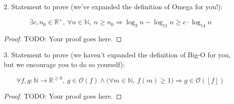 \documentclass[fontsize=11pt]{article}
\newcommand{\N}{\mathbb{N}}
\newcommand{\Z}{\mathbb{Z}}
\newcommand{\R}{\mathbb{R}}
\newcommand{\cO}{\mathcal{O}}
\newcommand{\floor}[1]{\left\lfloor #1 \right\rfloor}
\begin{document}
\begin{enumerate}
\begin{proof}
\begin{enumerate}
    \item[3.] Proving for $\forall e \in \N, e | (a + kn) \land e | n \implies e \le 1$ \\
        Let $e \in \N$ \\
        Suppose $e | (a + kn) \land e | n$ \\
        $a + kn = ex \land n = ey$ for some $x,y \in \Z$ \\
        $a + key = ex$ for some $x,y \in \Z$ \\
        $a = e(ky + x)$ for some $x,y \in \Z$ \\
        Let $c = (ky + x)$ \\
        By substitution, we now have: $a = ec$ \\
        Therefore, $\exists c \in \Z$ s.t. $a = ec$ is true. \\
        Which means $e | a$ is true. \\
        Since we are given $\forall e_2 \in \N, e_2 | a \land e_2 | n \implies e_2 \le 1$ \\
        Take $e_2 = e$, we now have $e | a \land e | n \implies e \le 1$ \\
        And since we now know $e | a$ and $e | n$, we can conclude $e \le 1$. \\
        Which is what we want to show.
\end{enumerate}


\end{proof}

\item[2.] Statement to prove (we've expanded the definition of Omega for you!):

$$\exists c, n_0 \in \R^+,~ \forall n \in \N,~ n \geq n_0 \Rightarrow \log_{3} n - \log_{11} n \geq c \cdot \log_{14} n$$

\begin{proof}
TODO: Your proof goes here.
\end{proof}

\item[3.] Statement to prove (we haven't expanded the definition of Big-O for you, but we encourage you to do so yourself):

$$\forall f, g: \N \to \R^{\geq 0},~ g \in \cO(f) \land \big(\forall m \in \N,~ f(m) \geq 1 \big) \Rightarrow g \in \cO(\floor{f})$$

\begin{proof}
TODO: Your proof goes here.
\end{proof}

\end{enumerate}
\end{document}
